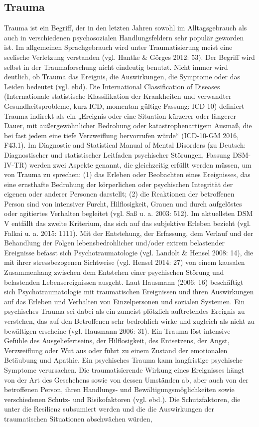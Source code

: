 \subsection{Trauma}
Trauma ist ein Begriff, der in den letzten Jahren sowohl im Alltagsgebrauch als auch in verschiedenen psychosozialen Handlungsfeldern sehr populär geworden ist. Im allgemeinen Sprachgebrauch wird unter Traumatisierung meist eine seelische Verletzung verstanden (vgl. Hantke \& Görges 2012: 53). Der Begriff wird selbst in der Traumaforschung nicht eindeutig benutzt. Nicht immer wird deutlich, ob Trauma das Ereignis, die Auswirkungen, die Symptome oder das Leiden bedeutet (vgl. ebd). Die International Classification of Diseases (Internationale statistische Klassifikation der Krankheiten und verwandter Gesundheitsprobleme, kurz ICD, momentan gültige Fassung: ICD-10) definiert Trauma indirekt als ein „Ereignis oder eine Situation kürzerer oder längerer Dauer, mit außergewöhnlicher Bedrohung oder katastrophenartigem Ausmaß, die bei fast jedem eine tiefe Verzweiflung hervorrufen würde“ (ICD-10-GM 2016, F43.1). Im Diagnostic and Statistical Manual of Mental Disorders (zu Deutsch: Diagnostischer und statistischer Leitfaden psychischer Störungen, Fassung DSM-IV-TR) werden zwei Aspekte genannt, die gleichzeitig erfüllt werden müssen, um von Trauma zu sprechen: (1) das Erleben oder Beobachten eines Ereignisses, das eine ernsthafte Bedrohung der körperlichen oder psychischen Integrität der eigenen oder anderer Personen darstellt; (2) die Reaktionen der betroffenen Person sind von intensiver Furcht, Hilflosigkeit, Grauen und durch aufgelöstes oder agitiertes Verhalten begleitet (vgl. Saß u. a. 2003: 512). Im aktuellsten DSM V entfällt das zweite Kriterium, das sich auf das subjektive Erleben bezieht (vgl. Falkai u. a. 2015: 1111). Mit der Entstehung, der Erfassung, dem Verlauf und der Behandlung der Folgen lebensbedrohlicher und/oder extrem belastender Ereignisse befasst sich Psychotraumatologie (vgl. Landolt \& Hensel 2008: 14), die mit ihrer stressbezogenen Sichtweise (vgl. Hensel 2014: 27) von einem kausalen Zusammenhang zwischen dem Entstehen einer psychischen Störung und belastenden Lebensereignissen ausgeht. Laut Hausmann (2006: 16) beschäftigt sich Psychotraumatologie mit traumatischen Ereignissen und ihren Auswirkungen auf das Erleben und Verhalten von Einzelpersonen und sozialen Systemen. Ein psychisches Trauma sei dabei als ein zumeist plötzlich auftretendes Ereignis zu verstehen, das auf den Betroffenen sehr bedrohlich wirke und zugleich als nicht zu bewältigen erscheine (vgl. Hausmann 2006: 31). Ein Trauma löst intensive Gefühle des Ausgeliefertseins, der Hilflosigkeit, des Entsetzens, der Angst, Verzweiflung oder Wut aus oder führt zu einem Zustand der emotionalen Betäubung und Apathie. Ein psychisches Trauma kann langfristige psychische Symptome verursachen. Die traumatisierende Wirkung eines Ereignisses hängt von der Art des Geschehens sowie von dessen Umständen ab, aber auch von der betroffenen Person, ihren Handlungs- und Bewältigungsmöglichkeiten sowie verschiedenen Schutz- und Risikofaktoren (vgl. ebd.). Die Schutzfaktoren, die unter die Resilienz subsumiert werden und die die Auswirkungen der traumatischen Situationen abschwächen würden, 